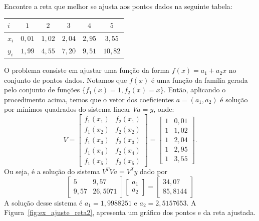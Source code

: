 \begin{ex}\label{ex:ajuste_reta2} Encontre a reta que melhor se ajusta aos pontos dados na seguinte tabela:
  \begin{center}
    \begin{tabular}{l|ccccc}
      $i$ & $1$   & $2$  & $3$ & $4$ & $5$\\\hline
      $x_i$& $0,01$ & $1,02$ & $2,04$ & $2,95$ & $3,55$\\
      $y_i$ & $1,99$ & $4,55$ & $7,20$ & $9,51$ & $10,82$
    \end{tabular}
  \end{center}
\end{ex}
\begin{sol}
O problema consiste em ajustar uma função da forma $f(x) = a_1 + a_2x$ no conjunto de pontos dados. Notamos que $f(x)$ é uma função da família gerada pelo conjunto de funções $\{f_1(x) = 1, f_2(x) = x\}$. Então, aplicando o procedimento acima, temos que o vetor dos coeficientes $a = (a_1, a_2)$ é solução por mínimos quadrados do sistema linear $Va = y$, onde:
\begin{equation}
  V = \begin{bmatrix}
    f_1(x_1) & f_2(x_1)\\
    f_1(x_2) & f_2(x_2)\\
    f_1(x_3) & f_2(x_3)\\
    f_1(x_4) & f_2(x_4)\\
    f_1(x_5) & f_2(x_5)
  \end{bmatrix}
= \begin{bmatrix}
    1 &0,01\\
    1 &1,02\\
    1 &2,04\\
    1 &2,95\\
    1 &3,55
\end{bmatrix}.
\end{equation}
Ou seja, é a solução do sistema $V^TVa = V^Ty$ dado por
\begin{equation}
  \begin{bmatrix}
    5     & 9,57 \\
    9,57  & 26,5071
  \end{bmatrix}
  \begin{bmatrix}
    a_1   \\
    a_2
  \end{bmatrix}=
  \begin{bmatrix}
    34,07  \\
    85,8144
  \end{bmatrix}
\end{equation}
A solução desse sistema é $a_1 = 1,9988251$ e $a_2 = 2,5157653$. A Figura~\ref{fig:ex_ajuste_reta2}, apresenta um gráfico dos pontos e da reta ajustada.


\end{sol}
